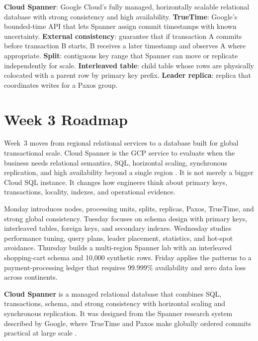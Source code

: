 \begin{keyterms}
\textbf{Cloud Spanner}: Google Cloud's fully managed, horizontally scalable relational database with strong consistency and high availability.
\textbf{TrueTime}: Google's bounded-time API that lets Spanner assign commit timestamps with known uncertainty.
\textbf{External consistency}: guarantee that if transaction A commits before transaction B starts, B receives a later timestamp and observes A where appropriate.
\textbf{Split}: contiguous key range that Spanner can move or replicate independently for scale.
\textbf{Interleaved table}: child table whose rows are physically colocated with a parent row by primary key prefix.
\textbf{Leader replica}: replica that coordinates writes for a Paxos group.
\end{keyterms}

\section{Week 3 Roadmap}
Week~3 moves from regional relational services to a database built for global transactional scale. Cloud Spanner is the GCP service to evaluate when the business needs relational semantics, SQL, horizontal scaling, synchronous replication, and high availability beyond a single region \cite{googlecloudspannerdocs}. It is not merely a bigger Cloud SQL instance. It changes how engineers think about primary keys, transactions, locality, indexes, and operational evidence.

Monday introduces nodes, processing units, splits, replicas, Paxos, TrueTime, and strong global consistency. Tuesday focuses on schema design with primary keys, interleaved tables, foreign keys, and secondary indexes. Wednesday studies performance tuning, query plans, leader placement, statistics, and hot-spot avoidance. Thursday builds a multi-region Spanner lab with an interleaved shopping-cart schema and 10,000 synthetic rows. Friday applies the patterns to a payment-processing ledger that requires 99.999\% availability and zero data loss across continents.

\begin{definitionbox}
\textbf{Cloud Spanner} is a managed relational database that combines SQL, transactions, schema, and strong consistency with horizontal scaling and synchronous replication. It was designed from the Spanner research system described by Google, where TrueTime and Paxos make globally ordered commits practical at large scale \cite{corbett2012spanner}.
\end{definitionbox}

